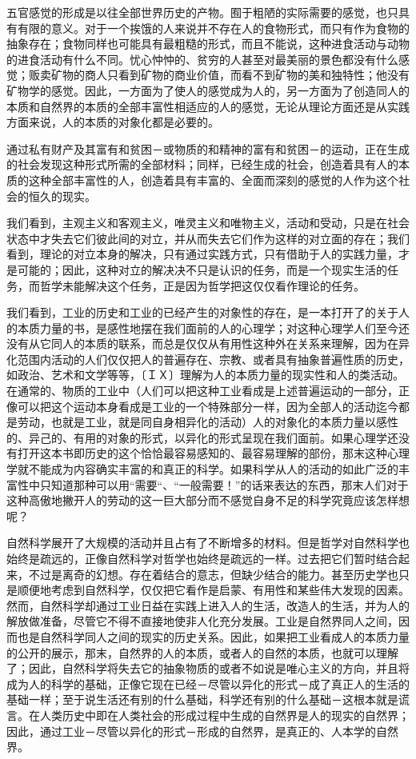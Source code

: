 \documentclass[a4paper,twoside,12pt]{ctexart}
\begin{document}
五官感觉的形成是以往全部世界历史的产物。囿于粗陋的实际需要的感觉，也只具有有限的意义。对于一个挨饿的人来说并不存在人的食物形式，而只有作为食物的抽象存在；食物同样也可能具有最粗糙的形式，而且不能说，这种进食活动与动物的进食活动有什么不同。忧心忡忡的、贫穷的人甚至对最美丽的景色都没有什么感觉；贩卖矿物的商人只看到矿物的商业价值，而看不到矿物的美和独特性；他没有矿物学的感觉。因此，一方面为了使人的感觉成为人的，另一方面为了创造同人的本质和自然界的本质的全部丰富性相适应的人的感觉，无论从理论方面还是从实践方面来说，人的本质的对象化都是必要的。

通过私有财产及其富有和贫困－或物质的和精神的富有和贫困－的运动，正在生成的社会发现这种形式所需的全部材料；同样，已经生成的社会，创造着具有人的本质的这种全部丰富性的人，创造着具有丰富的、全面而深刻的感觉的人作为这个社会的恒久的现实。

我们看到，主观主义和客观主义，唯灵主义和唯物主义，活动和受动，只是在社会状态中才失去它们彼此间的对立，并从而失去它们作为这样的对立面的存在；我们看到，理论的对立本身的解决，只有通过实践方式，只有借助于人的实践力量，才是可能的；因此，这种对立的解决决不只是认识的任务，而是一个现实生活的任务，而哲学未能解决这个任务，正是因为哲学把这仅仅看作理论的任务。

我们看到，工业的历史和工业的已经产生的对象性的存在，是一本打开了的关于人的本质力量的书，是感性地摆在我们面前的人的心理学；对这种心理学人们至今还没有从它同人的本质的联系，而总是仅仅从有用性这种外在关系来理解，因为在异化范围内活动的人们仅仅把人的普遍存在、宗教、或者具有抽象普遍性质的历史，如政治、艺术和文学等等，〔ＩＸ〕理解为人的本质力量的现实性和人的类活动。在通常的、物质的工业中（人们可以把这种工业看成是上述普遍运动的一部分，正像可以把这个运动本身看成是工业的一个特殊部分一样，因为全部人的活动迄今都是劳动，也就是工业，就是同自身相异化的活动）人的对象化的本质力量以感性的、异己的、有用的对象的形式，以异化的形式呈现在我们面前。如果心理学还没有打开这本书即历史的这个恰恰最容易感知的、最容易理解的部份，那末这种心理学就不能成为内容确实丰富的和真正的科学。如果科学从人的活动的如此广泛的丰富性中只知道那种可以用“需要“、“一般需要！”的话来表达的东西，那末人们对于这种高傲地撇开人的劳动的这一巨大部分而不感觉自身不足的科学究竟应该怎样想呢？

自然科学展开了大规模的活动并且占有了不断增多的材料。但是哲学对自然科学也始终是疏远的，正像自然科学对哲学也始终是疏远的一样。过去把它们暂时结合起来，不过是离奇的幻想。存在着结合的意志，但缺少结合的能力。甚至历史学也只是顺便地考虑到自然科学，仅仅把它看作是启蒙、有用性和某些伟大发现的因素。然而，自然科学却通过工业日益在实践上进入人的生活，改造人的生活，并为人的解放做准备，尽管它不得不直接地使非人化充分发展。工业是自然界同人之间，因而也是自然科学同人之间的现实的历史关系。因此，如果把工业看成人的本质力量的公开的展示，那末，自然界的人的本质，或者人的自然的本质，也就可以理解了；因此，自然科学将失去它的抽象物质的或者不如说是唯心主义的方向，并且将成为人的科学的基础，正像它现在已经－尽管以异化的形式－成了真正人的生活的基础一样；至于说生活还有别的什么基础，科学还有别的什么基础－这根本就是谎言。在人类历史中即在人类社会的形成过程中生成的自然界是人的现实的自然界；因此，通过工业－尽管以异化的形式－形成的自然界，是真正的、人本学的自然界。
\end{document}
